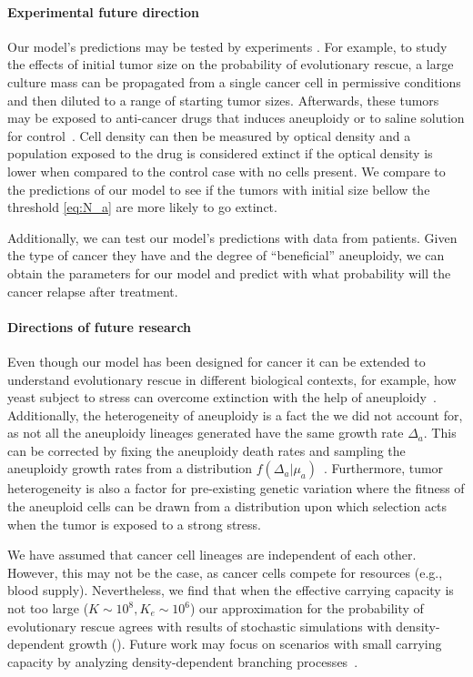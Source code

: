 \documentclass[12pt]{extarticle}
\begin{document}
\paragraph{Experimental future direction}
Our model's predictions may be tested by experiments \citep{martin2013probability}. For example, to study the effects of initial tumor size on the probability of evolutionary rescue, a large culture mass can be propagated from a single cancer cell in permissive conditions and then diluted to a  range of starting tumor sizes. Afterwards, these tumors may be exposed to anti-cancer drugs that induces aneuploidy or to saline solution for control~\citep{ippolito2021gene}. 
Cell density can then be measured by optical density and a population exposed to the drug is considered extinct if the optical density is lower when compared to the control case with no cells present. We compare to the predictions of our model to see if the tumors with initial size bellow the threshold \eqref{eq:N_a} are more likely to go extinct.   

Additionally, we can test our model's predictions with data from patients. Given the type of cancer they have and the degree of ``beneficial'' aneuploidy,  we can obtain the parameters for our model and predict with what probability will the cancer relapse after treatment.


\paragraph{Directions of future research}
Even though our model has been designed for cancer it can be extended to understand evolutionary rescue in different biological contexts, for example, how yeast subject to stress can overcome extinction with the help of aneuploidy~\citep{pompei2023fitness}. Additionally, the heterogeneity of aneuploidy is a fact the we did not account for, as not all the aneuploidy lineages generated have the same growth rate $\Delta_a$. This can be corrected by  fixing the aneuploidy death rates and sampling the aneuploidy growth rates from a distribution $f\left(\Delta_a|\mu_a\right)$~\citet{martin2013probability}. Furthermore, tumor heterogeneity is also a factor for pre-existing genetic variation where the fitness of the aneuploid cells can be drawn from a distribution upon which selection acts when the tumor is exposed to a strong stress.

We have assumed that cancer cell lineages are independent of each other. However, this may not be the case, as cancer cells compete for resources (e.g., blood supply). Nevertheless, we find that when the effective carrying capacity is not too large ($K\sim10^8, K_e\sim10^6$) 
our approximation for the probability of evolutionary rescue agrees with results of stochastic simulations with density-dependent growth  ().
Future work may focus on scenarios with small carrying capacity by analyzing density-dependent branching processes~\citep{klebaner1997population,harris1963theory}. 
\end{document}
